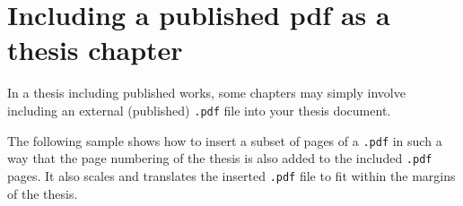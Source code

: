 \chapter{Including a published pdf as a thesis chapter}

In a thesis including published works, some chapters may simply involve including an external (published) \texttt{.pdf} file into your thesis document.

The following sample shows how to insert a subset of pages of a \texttt{.pdf} in such a way that the page numbering of the thesis is also added to the included \texttt{.pdf} pages. 
It also scales and translates the inserted \texttt{.pdf} file to fit within the margins of the thesis. 

